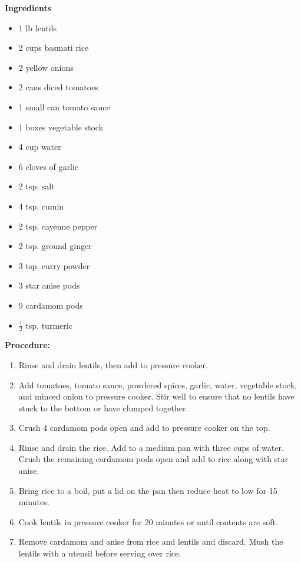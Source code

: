 \begin{multicols}{2}
\textbf{Ingredients}
\begin{itemize}
\item 1 lb lentils
\item 2 cups basmati rice
\item 2 yellow onions
\item 2 cans diced tomatoes
\item 1 small can tomato sauce
\item 1 boxes vegetable stock
\item 4 cup water 
\item 6 cloves of garlic
\item 2 tsp. salt
\item 4 tsp. cumin
\item 2 tsp. cayenne pepper
\item 2 tsp. ground ginger
\item 3 tsp. curry powder
\item 3 star anise pods
\item 9 cardamom pods
\item $\frac{1}{2}$ tsp. turmeric 


\end{itemize}


\columnbreak
\textbf{Procedure:}
\medskip


\begin{enumerate}

\item Rinse and drain lentils, then add to pressure cooker. 
\item Add tomatoes, tomato sauce, powdered spices, garlic, water, vegetable stock, and minced onion to pressure cooker. Stir well to ensure that no lentils have stuck to the bottom or have clumped together. 
\item Crush 4 cardamom pods open and add to pressure cooker on the top. 

\item Rinse and drain the rice. Add to a medium pan with three cups of water. Crush the remaining cardamom pods open and add to rice along with star anise. 
\item Bring rice to a boil, put a lid on the pan then reduce heat to low for 15 minutes. 

\item Cook lentils in pressure cooker for 20 minutes or until contents are soft. 
\item Remove cardamom and anise from rice and lentils and discard. Mush the lentils with a utensil before serving over rice. 

 
\end{enumerate}
\end{multicols}